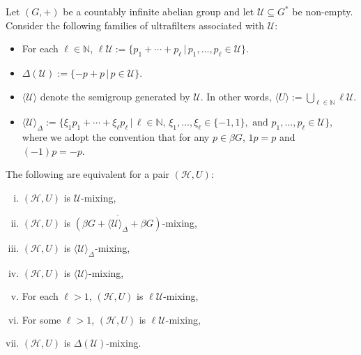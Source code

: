 \documentclass[graybox]{svmult}
\theoremstyle{definition}
\newcommand{\N}{\mathbb{N}}
\begin{document}
\begin{proposition}\label{prop:DifferentFamiliesForSameUmixing}
    Let $(G,+)$ be a countably infinite abelian group and let $\mathcal U\subseteq G^*$ be non-empty. Consider the following families of ultrafilters associated with $\mathcal U$: 
    \begin{itemize}
         \item For each $\ell\in\N$, $\ell\mathcal U:=\{p_1+\cdots+p_\ell\,|\,p_1,...,p_\ell\in\mathcal U\}$.
         \item $\Delta(\mathcal U):=\{-p+p\,|\,p\in\mathcal U\}$.
        \item $\langle \mathcal U\rangle$ denote the semigroup generated by $\mathcal U$. In other words, 
        $\langle U\rangle:=\bigcup_{\ell\in\N}\ell\mathcal U$.
        \item $\langle \mathcal U\rangle_\Delta:=\{\xi_1p_1+\cdots+\xi_\ell p_\ell\,|\,\ell\in\N,\,\xi_1,...,\xi_\ell\in\{-1,1\},\text{ and }p_1,...,p_\ell\in\mathcal U\}$, where we adopt the convention that for any $p\in\beta G$, $1p=p$ and $(-1)p=-p$.
    \end{itemize}
    The following are equivalent for a pair $(\mathcal H,U)$: 
    \begin{enumerate}[(i)]
        \item $(\mathcal H,U)$  is $\mathcal U$-mixing,

        \item $(\mathcal H,U)$ is $\overline{(\beta G+\langle\mathcal U\rangle_\Delta+\beta G)}$-mixing,

        \item $(\mathcal H,U)$ is $\langle \mathcal U\rangle_\Delta$-mixing, 
        
        \item $(\mathcal H,U)$ is $\langle \mathcal U\rangle$-mixing,

        \item For each $\ell>1$, $(\mathcal H,U)$ is $\ell\mathcal U$-mixing, 

        \item For some $\ell>1$, $(\mathcal H,U)$ is $\ell\mathcal U$-mixing, 
        
        \item $(\mathcal H,U)$ is $\Delta(\mathcal U)$-mixing. 
    \end{enumerate}
\end{proposition}
\end{document}
